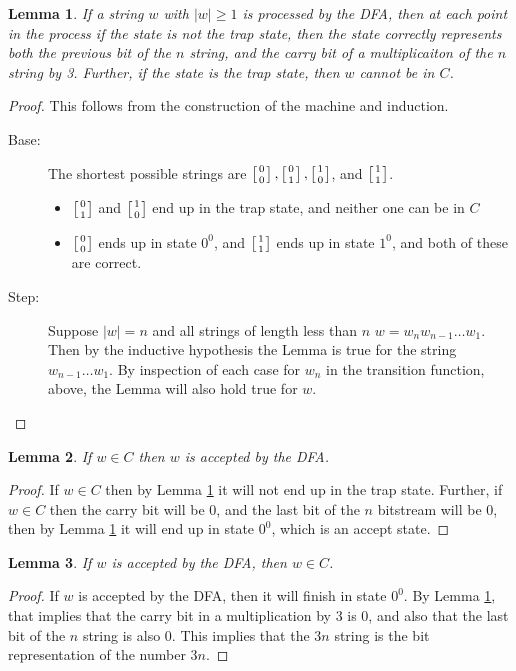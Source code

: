 \documentclass{article}
\newtheorem{lemma}{Lemma}
\newcommand{\duple}[2]{\left[{#1}\atop{#2}\right]}
\begin{document}
\begin{enumerate}
  \begin{lemma}\label{lemma1}
    If a string $w$ with $|w|\geq 1$ is processed by the DFA, then at
    each point in the process if the state is not the trap state, then
    the state correctly represents both the previous bit of the $n$
    string, and the carry bit of a multiplicaiton of the $n$ string by
    3.  Further, if the state is the trap state, then $w$ cannot be in
    $C$.
    \end{lemma}
  \begin{proof}
This follows from the construction of the machine and induction.
    \begin{description}
      \item[Base:] The shortest possible strings are $\duple
        00, \duple 01, \duple10$, and $\duple11$.
        \begin{itemize}
          \item $\duple 01$ and $\duple10$ end up in the trap state,
            and neither one can be in $C$
          \item  $\duple00$ ends up in state $0^0$, and $\duple 11$
            ends up in state $1^0$, and both of these are correct.
        \end{itemize}
      \item[Step:] Suppose $|w|=n$ and all strings of length less than
        $n$ $w=w_nw_{n-1}\ldots w_1$.  Then by the inductive
        hypothesis the Lemma is true for the string $w_{n-1}\ldots
        w_1$.  By inspection of each case for $w_n$ in the transition
        function, above, the Lemma will also hold true for $w$.
    \end{description}
    
  \end{proof}

  \begin{lemma}\label{lemma2}
    If $w\in C$ then $w$ is accepted by the DFA.
  \end{lemma}
  \begin{proof}
    If $w\in C$ then by Lemma \ref{lemma1} it will not end up in the
    trap state.  Further, if $w\in C$ then the carry bit will be 0,
    and the last bit of the $n$ bitstream will be 0, then by Lemma
    \ref{lemma1} it will end up in state $0^0$, which is an accept state.
  \end{proof}

  \begin{lemma}\label{lemma3}
    If $w$ is accepted by the DFA, then $w\in C$.
  \end{lemma}
  \begin{proof}
If $w$ is accepted by the DFA, then  it will
finish in state $0^0$. By Lemma \ref{lemma1}, that implies that the
carry bit in a multiplication by 3 is 0, and also that the last bit of
the $n$ string is also 0.  This implies that the $3n$ string is the
bit representation of the number $3n$.
  \end{proof}


\end{enumerate}
\end{document}
